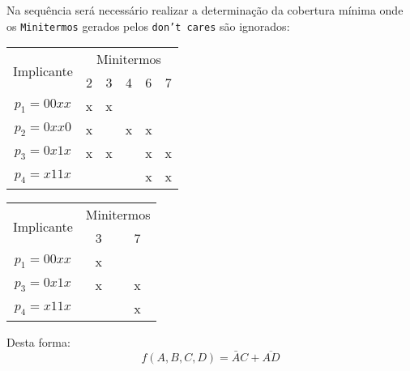 \documentclass{article}
\begin{document}
\begin{resolution}
\begin{table}[H]
                \end{table}\noindent
                Na sequência será necessário realizar a determinação da cobertura mínima onde os \texttt{Minitermos} gerados pelos \texttt{don't cares} são ignorados:
                    \begin{table}[H]
                        \centering\begin{tabular}{c|ccccc}
                            \multirow{2}{*}{Implicante} & \multicolumn{5}{c}{Minitermos}\\
                                                        &2&3&4&6&7\\\hline
                            $p_1 = 00xx$                &x&x& & & \\
                            \textcolor{blue!75}{$p_2=0xx0$} &x& &x&x& \\
                            $p_3 = 0x1x$                &x&x& &x&x\\
                            $p_4 = x11x$                & & & &x&x\\\hline
                        \end{tabular}
                        \qquad
                        \centering\begin{tabular}{c|cc}
                            \multirow{2}{*}{Implicante} & \multicolumn{2}{c}{Minitermos}\\
                                                        &3&7\\\hline
                            $p_1 = 00xx$                &x& \\
                            \textcolor{blue!75}{$p_3=0x1x$} &x&x\\
                            $p_4 = x11x$                & &x\\\hline
                        \end{tabular}
                    \end{table}
                Desta forma:
                    \begin{equation}
                        \boxed{f(A,B,C,D) = \bar{A}C + \overline{AD}}
                    \end{equation}
            \end{resolution}
\end{document}
